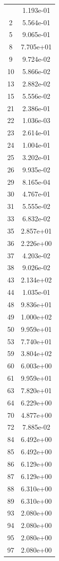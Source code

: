 \documentclass[12pt]{article}
\begin{document}
\begin{longtable}{@{}cc@{}}
\bottomrule
\endlastfoot
1 & 1.193e-01 \\
2 & 5.564e-01 \\
5 & 9.065e-01 \\
8 & 7.705e+01 \\
9 & 9.724e-02 \\
10 & 5.866e-02 \\
13 & 2.882e-02 \\
15 & 5.556e-02 \\
21 & 2.386e-01 \\
22 & 1.036e-03 \\
23 & 2.614e-01 \\
24 & 1.004e-01 \\
25 & 3.202e-01 \\
26 & 9.935e-02 \\
29 & 8.165e-04 \\
30 & 4.767e-01 \\
31 & 5.555e-02 \\
33 & 6.832e-02 \\
35 & 2.857e+01 \\
36 & 2.226e+00 \\
37 & 4.203e-02 \\
38 & 9.026e-02 \\
43 & 2.134e+02 \\
44 & 1.035e-01 \\
48 & 9.836e+01 \\
49 & 1.000e+02 \\
50 & 9.959e+01 \\
53 & 7.740e+01 \\
59 & 3.804e+02 \\
60 & 6.003e+00 \\
61 & 9.959e+01 \\
63 & 7.820e+01 \\
64 & 6.229e+00 \\
70 & 4.877e+00 \\
72 & 7.885e-02 \\
84 & 6.492e+00 \\
85 & 6.492e+00 \\
86 & 6.129e+00 \\
87 & 6.129e+00 \\
88 & 6.310e+00 \\
89 & 6.310e+00 \\
93 & 2.080e+00 \\
94 & 2.080e+00 \\
95 & 2.080e+00 \\
97 & 2.080e+00 \\

\end{longtable}
\end{document}
